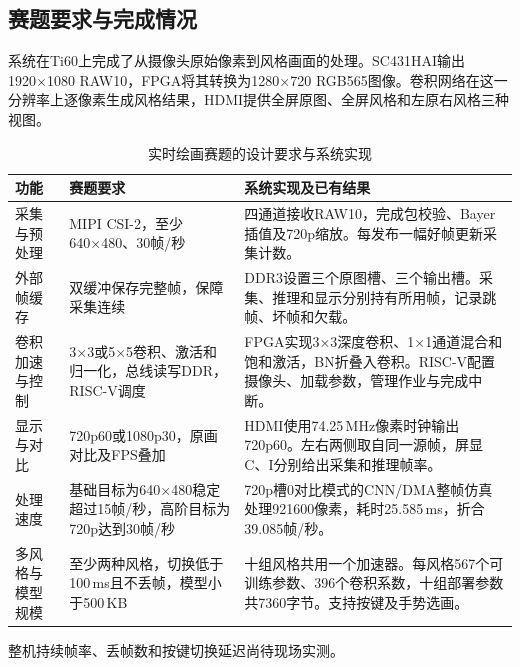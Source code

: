 \subsection{赛题要求与完成情况}
系统在Ti60上完成了从摄像头原始像素到风格画面的处理。SC431HAI输出1920×1080 RAW10，FPGA将其转换为1280×720 RGB565图像。卷积网络在这一分辨率上逐像素生成风格结果，HDMI提供全屏原图、全屏风格和左原右风格三种视图。

\begin{table}[H]\centering\small
\caption{实时绘画赛题的设计要求与系统实现}\label{tab:contest}
\begin{tabularx}{\linewidth}{@{}p{.20\linewidth}p{.31\linewidth}X@{}}\toprule
功能 & 赛题要求 & 系统实现及已有结果\\\midrule
采集与预处理 & MIPI CSI-2，至少640×480、30帧/秒 & 四通道接收RAW10，完成包校验、Bayer插值及720p缩放。每发布一幅好帧更新采集计数。\\
外部帧缓存 & 双缓冲保存完整帧，保障采集连续 & DDR3设置三个原图槽、三个输出槽。采集、推理和显示分别持有所用帧，记录跳帧、坏帧和欠载。\\
卷积加速与控制 & 3×3或5×5卷积、激活和归一化，总线读写DDR，RISC-V调度 & FPGA实现3×3深度卷积、1×1通道混合和饱和激活，BN折叠入卷积。RISC-V配置摄像头、加载参数，管理作业与完成中断。\\
显示与对比 & 720p60或1080p30，原画对比及FPS叠加 & HDMI使用74.25\,MHz像素时钟输出720p60。左右两侧取自同一源帧，屏显C、I分别给出采集和推理帧率。\\
处理速度 & 基础目标为640×480稳定超过15帧/秒，高阶目标为720p达到30帧/秒 & 720p槽0对比模式的CNN/DMA整帧仿真处理921600像素，耗时25.585\,ms，折合39.085帧/秒。\\
多风格与模型规模 & 至少两种风格，切换低于100\,ms且不丢帧，模型小于500\,KB & 十组风格共用一个加速器。每风格567个可训练参数、396个卷积系数，十组部署参数共7360字节。支持按键及手势选画。\\\bottomrule
\end{tabularx}\end{table}
整机持续帧率、丢帧数和按键切换延迟尚待现场实测。
